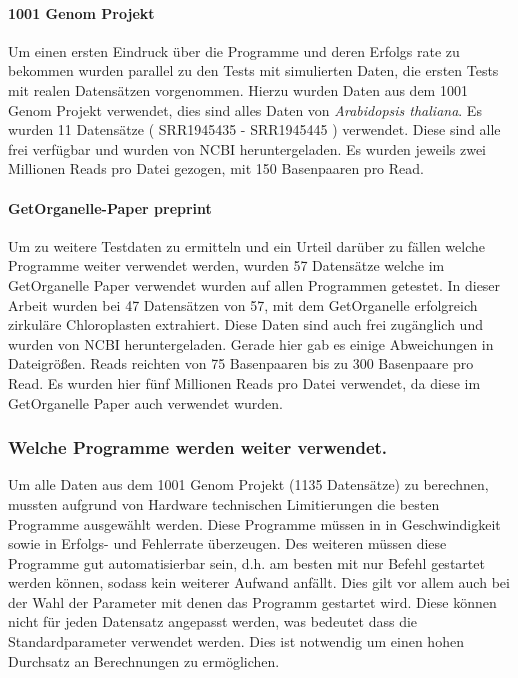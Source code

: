 \documentclass{scrartcl}
\begin{document}
\paragraph{1001 Genom Projekt}
\label{sec-3-1-1-2}
Um einen ersten Eindruck über die Programme und deren Erfolgs rate zu bekommen wurden parallel zu den Tests mit simulierten Daten, die ersten Tests mit realen Datensätzen vorgenommen. 
Hierzu wurden Daten aus dem 1001 Genom Projekt\footnotemark[38]{} verwendet, dies sind alles Daten von \emph{Arabidopsis thaliana}. Es wurden 11 Datensätze ( SRR1945435 - SRR1945445 ) verwendet. Diese sind alle
frei verfügbar und wurden von NCBI heruntergeladen. Es wurden jeweils zwei Millionen Reads pro Datei gezogen, mit 150 Basenpaaren pro Read. 

\paragraph{GetOrganelle-Paper preprint}
\label{sec-3-1-1-3}
Um zu weitere Testdaten zu ermitteln und ein Urteil darüber zu fällen welche Programme weiter verwendet werden,
wurden 57 Datensätze welche im GetOrganelle Paper \footnotemark[28]{} verwendet wurden
auf allen Programmen getestet. In dieser Arbeit wurden bei 47 Datensätzen von 57, mit
dem GetOrganelle erfolgreich zirkuläre Chloroplasten extrahiert. Diese Daten sind auch frei zugänglich und wurden
von NCBI heruntergeladen. Gerade hier gab es einige Abweichungen in Dateigrößen. Reads reichten von 75 Basenpaaren 
bis zu 300 Basenpaare pro Read. Es wurden hier fünf Millionen Reads pro Datei verwendet, da diese im GetOrganelle Paper
auch verwendet wurden.

\subsubsection{Welche Programme werden weiter verwendet.}
\label{sec-3-1-2}
Um alle Daten aus dem 1001 Genom Projekt (1135 Datensätze) zu berechnen, mussten aufgrund 
von Hardware technischen Limitierungen die besten Programme ausgewählt werden. Diese Programme müssen in
in Geschwindigkeit sowie in Erfolgs- und Fehlerrate überzeugen. Des weiteren müssen diese Programme gut automatisierbar sein, 
d.h. am besten mit nur Befehl gestartet werden können, sodass kein weiterer Aufwand anfällt. Dies gilt
vor allem auch bei der Wahl der Parameter mit denen das Programm gestartet wird. Diese können nicht 
für jeden Datensatz angepasst werden, was bedeutet dass die Standardparameter verwendet werden.
Dies ist notwendig um einen hohen Durchsatz an Berechnungen zu ermöglichen.
\end{document}

